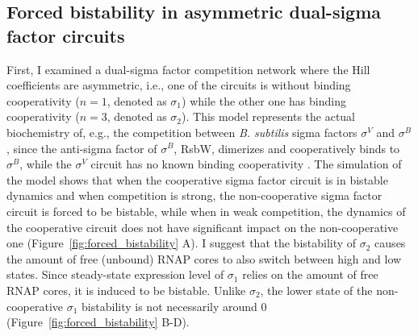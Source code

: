 \subsection{Forced bistability in asymmetric dual-sigma factor circuits}
\label{sec:forced_bistability}

First, I examined a dual-sigma factor competition network where
the Hill coefficients are asymmetric, i.e.,
one of the circuits is without binding cooperativity ($n = 1$, denoted as
$\sigma_1$) while the other one has binding cooperativity
($n = 3$, denoted as $\sigma_2$).
This model represents the actual biochemistry of, e.g., the competition between
\textit{B. subtilis} sigma factors $\sigma^V$ and $\sigma^B$,
since the anti-sigma factor of $\sigma^B$, RsbW, dimerizes and 
cooperatively binds to $\sigma^B$, while the $\sigma^V$ circuit has no known
binding cooperativity \cite{narula16, schwall21a}.
The simulation of the model shows that when the cooperative sigma factor circuit
is in bistable dynamics and when competition is strong,
the non-cooperative sigma factor circuit is forced to be bistable,
while when in weak competition, the dynamics of the cooperative circuit
does not have significant impact on the non-cooperative one
(Figure~\ref{fig:forced_bistability} A).
I suggest that the bistability of $\sigma_2$ causes the amount of free (unbound)
RNAP cores to also switch between high and low states.
Since steady-state expression level of $\sigma_1$ relies on the amount of 
free RNAP cores, it is induced to be bistable.
Unlike $\sigma_2$, the lower state of the non-cooperative $\sigma_1$ bistability
is not necessarily around 0 (Figure~\ref{fig:forced_bistability} B-D).

